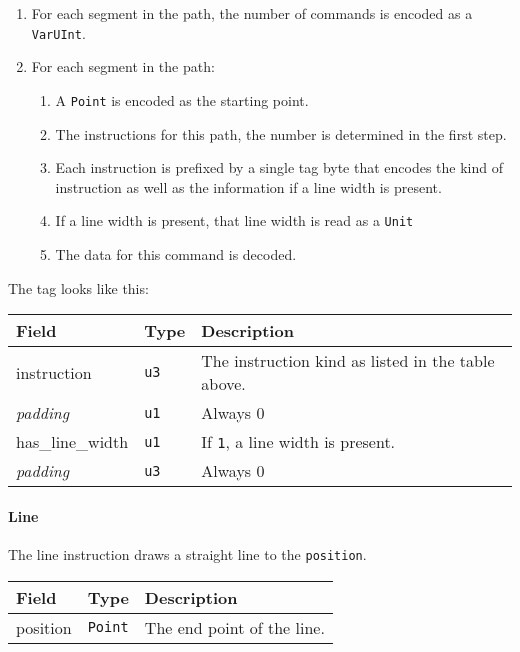 \documentclass[]{article}
\providecommand{\tightlist}{%
  \setlength{\itemsep}{0pt}\setlength{\parskip}{0pt}}
\begin{document}
\begin{enumerate}
\def\labelenumi{\arabic{enumi}.}
\tightlist
\item
  For each segment in the path, the number of commands is encoded as a
  \texttt{VarUInt}.
\item
  For each segment in the path:

  \begin{enumerate}
  \def\labelenumii{\arabic{enumii}.}
  \tightlist
  \item
    A \texttt{Point} is encoded as the starting point.
  \item
    The instructions for this path, the number is determined in the
    first step.
  \item
    Each instruction is prefixed by a single tag byte that encodes the
    kind of instruction as well as the information if a line width is
    present.
  \item
    If a line width is present, that line width is read as a
    \texttt{Unit}
  \item
    The data for this command is decoded.
  \end{enumerate}
\end{enumerate}

The tag looks like this:

\begin{longtable}[]{@{}p{1in}p{0.5in}p{4.5in}@{}}
\toprule
Field & Type & Description \\
\midrule
\endhead
instruction & \texttt{u3} & The instruction kind as listed in the table above. \\
\emph{padding} & \texttt{u1} & Always 0 \\
has\_line\_width & \texttt{u1} & If \texttt{1}, a line width is present. \\
\emph{padding} & \texttt{u3} & Always 0 \\
\bottomrule
\end{longtable}

\hypertarget{line-1}{\paragraph{Line}\label{line-1}}

The line instruction draws a straight line to the \texttt{position}.

\begin{longtable}[]{@{}p{1in}p{0.5in}p{4.5in}@{}}
\toprule
Field & Type & Description \\
\midrule
\endhead
position & \texttt{Point} & The end point of the line. \\
\bottomrule
\end{longtable}
\end{document}
